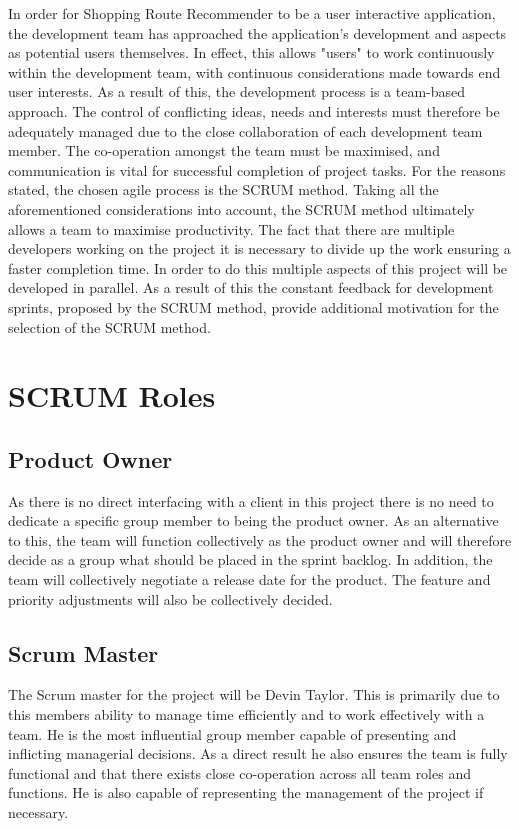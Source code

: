 \documentclass[10pt, a4paper, onecolumn]{scrartcl}
\begin{document}
			In order for Shopping Route Recommender to be a user interactive application, the development team has approached the application's development and aspects as potential users themselves. In effect, this allows "users" to work continuously within the development team, with continuous considerations made towards end user interests. As a result of this, the development process is a team-based approach. The control of conflicting ideas, needs and interests must therefore be adequately managed due to the close collaboration of each development team member. The co-operation amongst the team must be maximised, and communication is vital for successful completion of project tasks. For the reasons stated, the chosen agile process is the SCRUM method. Taking all the aforementioned considerations into account, the SCRUM method ultimately allows a team to maximise productivity.  The fact that there are multiple developers working on the project it is necessary to divide up the work ensuring a faster completion time. In order to do this multiple aspects of this project will be developed in parallel. As a result of this the constant feedback for development sprints, proposed by the SCRUM method, provide additional motivation for the selection of the SCRUM method.
		
	\section{SCRUM Roles}
	
		\subsection{Product Owner}
		
			As there is no direct interfacing with a client in this project there is no need to dedicate a specific group member to being the product owner. As an alternative to this, the team will function collectively as the product owner and will therefore decide as a group what should be placed in the sprint backlog. In addition, the team will collectively negotiate a release date for the product. The feature and priority adjustments will also be collectively decided. 
			
		\subsection{Scrum Master}
		
			The Scrum master for the project will be Devin Taylor. This is primarily due to this members ability to manage time efficiently and to work effectively with a team. He is the most influential group member capable of presenting and inflicting  managerial decisions. As a direct result he also ensures the team is fully functional and that there exists close co-operation across all team roles and functions. He is also capable of representing the management of the project if necessary.  
			
\end{document}
